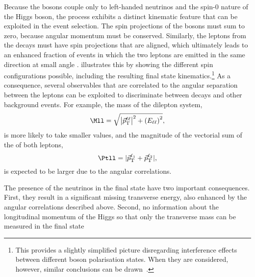 Because the \Wboson bosons couple only to left-handed neutrinos and the spin-0 nature of the Higgs boson, the \HWWdet process exhibits a distinct kinematic feature that can be exploited in the event selection.
The spin projections of the \Wboson bosons must sum to zero, because angular momentum must be conserved.
Similarly, the leptons from the \Wboson decays must have spin projections that are aligned, which ultimately leads to
an enhanced fraction of \HWWdet events in which the two leptons are emitted in the same direction at small angle \DPhill.
 illustrates this by showing the different spin configurations possible, including the resulting final state kinematics.\footnote{This provides a slightly simplified picture disregarding interference effects between different \Wboson boson polarisation states. When they are considered, however, similar conclusions can be drawn~\cite{Maina_2021}.}
As a consequence, several observables that are correlated to the angular separation between the leptons can be exploited to discriminate between \HWW decays and other background events. For example, the mass of the dilepton system,
\begin{equation}
    \Mll = \sqrt{\left| \vec{p}_{\text{T}}^{\ell\ell} \right|^2+ \left( E_{\ell\ell} \right)^2},
\end{equation}
is more likely to take smaller values, and the magnitude of the vectorial sum of the \pT of both leptons,
\begin{equation}
    \Ptll = |\vec{p}_\text{T}^{\ell_1} + \vec{p}_\text{T}^{\ell_2}|,
\end{equation}
is expected to be larger due to the angular correlations. 

The presence of the neutrinos in the final state have two important consequences.
First, they result in a significant missing transverse energy, also enhanced by the angular correlations described above. 
Second, no information about the longitudinal momentum of the Higgs so that only the transverse mass can be measured in the final state


